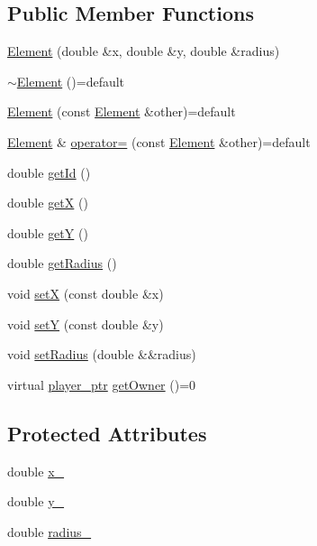 \subsection*{Public Member Functions}
\begin{DoxyCompactItemize}
\item 
\hyperlink{classwebsocket_1_1Element_a6d6b671ae2f922c12c0a64a94bd669fb}{Element} (double \&x, double \&y, double \&radius)
\item 
\hyperlink{classwebsocket_1_1Element_a4a249effc753deac10eb2eb7fc80c759}{$\sim$\+Element} ()=default
\item 
\hyperlink{classwebsocket_1_1Element_a7b16c1d2898cb3d1db6b5305045838bf}{Element} (const \hyperlink{classwebsocket_1_1Element}{Element} \&other)=default
\item 
\hyperlink{classwebsocket_1_1Element}{Element} \& \hyperlink{classwebsocket_1_1Element_a3c188d2039c89735c2d5e09123266397}{operator=} (const \hyperlink{classwebsocket_1_1Element}{Element} \&other)=default
\item 
double \hyperlink{classwebsocket_1_1Element_adb9892f7b44913049e0c771816efd7a4}{get\+Id} ()
\item 
double \hyperlink{classwebsocket_1_1Element_a6102d0b4ccbad0194ee393fa5341cabc}{getX} ()
\item 
double \hyperlink{classwebsocket_1_1Element_a597f360c2c593a6610a2a9103d5e876b}{getY} ()
\item 
double \hyperlink{classwebsocket_1_1Element_a895b218f0ec4d2d4e2164c2531a8ffe3}{get\+Radius} ()
\item 
void \hyperlink{classwebsocket_1_1Element_aba38ddf15ce77e2e79bce80cf38947db}{setX} (const double \&x)
\item 
void \hyperlink{classwebsocket_1_1Element_ab05d0ca40f4d1a79d52cb31c5b4f789b}{setY} (const double \&y)
\item 
void \hyperlink{classwebsocket_1_1Element_a4ad55c97fa8f5684af5bc25780450db1}{set\+Radius} (double \&\&radius)
\item 
virtual \hyperlink{namespacewebsocket_aec8d52893bdf524a1412533a63b006a3}{player\+\_\+ptr} \hyperlink{classwebsocket_1_1Element_a28027c861e94306a7666d839db910f2a}{get\+Owner} ()=0
\end{DoxyCompactItemize}
\subsection*{Protected Attributes}
\begin{DoxyCompactItemize}
\item 
double \hyperlink{classwebsocket_1_1Element_adb51cfefd07378c784d30340c449a224}{x\+\_\+}
\item 
double \hyperlink{classwebsocket_1_1Element_a61ea05afb0180339005d1c96786a60ce}{y\+\_\+}
\item 
double \hyperlink{classwebsocket_1_1Element_aec20349985f8c1bc19d6f686658e6c62}{radius\+\_\+}
\end{DoxyCompactItemize}

